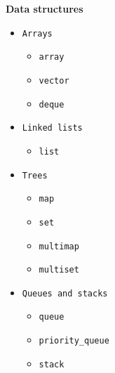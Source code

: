 \documentclass[fontsize=8pt, a4paper, landscape, fleqn]{scrartcl}
\renewcommand{\subsection}[1]{%
    \noindent\colorbox{subsectioncolor}{%
        \parbox{\dimexpr\columnwidth-2\fboxsep}{\color{white}\textbf{#1}}}%
    \vspace{0.5mm}%
}
\begin{document}
\begin{multicols*}{3}[\raggedcolumns]
    \subsection{Data structures}
    \begin{multicols}{3}
    \begin{itemize}
        \item \lstinline{Arrays}
        \begin{itemize}
            \item \lstinline{array}
            \item \lstinline{vector}
            \item \lstinline{deque}
        \end{itemize}
        \item \lstinline{Linked lists}
        \begin{itemize}
            \item \lstinline{list}
        \end{itemize}
        \item \lstinline{Trees}
        \begin{itemize}
            \item \lstinline{map}
            \item \lstinline{set}
            \item \lstinline{multimap}
            \item \lstinline{multiset}
        \end{itemize}
        \item \lstinline{Queues and stacks}
        \begin{itemize}
            \item \lstinline{queue}
            \item \lstinline{priority_queue}
            \item \lstinline{stack}
        \end{itemize}
    \end{itemize}
    \end{multicols}
    

\end{multicols*}
\end{document}
